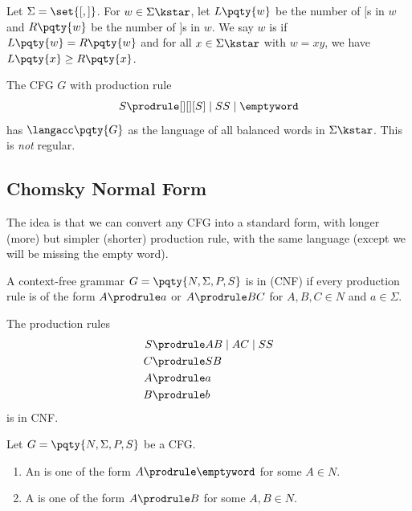 \begin{definition}
    Let \(\Sigma = \set{[, ]}\). For \(w \in \Sigma\kstar\), let \(L\pqty{w}\) be the number of \([\)s in \(w\) and \(R\pqty{w}\) be the number of \(]\)s in \(w\). We say \(w\) is  if \(L\pqty{w} = R\pqty{w}\) and for all \(x \in \Sigma\kstar\) with \(w = xy\), we have \(L\pqty{x} \geq R\pqty{x}\).
\end{definition}

\begin{proposition}
    \label{prop:balanced-parentheses}%
    The CFG \(G\) with production rule
    \[
        S \prodrule[][] [S] \mid SS \mid \emptyword
    \]
    has \(\langacc\pqty{G}\) as the language of all balanced words in \(\Sigma\kstar\). This is \emph{not} regular.
\end{proposition}

\subsection{Chomsky Normal Form}

The idea is that we can convert any CFG into a standard form, with longer (more) but simpler (shorter) production rule, with the same language (except we will be missing the empty word).

\begin{definition}
    A context-free grammar \(G = \pqty{N, \Sigma, P, S}\) is in  (CNF) if every production rule is of the form \(A \prodrule a\) or \(A \prodrule BC\) for \(A, B, C \in N\) and \(a \in \Sigma\).
\end{definition}

\begin{example}
    \label{ex:brackets-in-disguise}%
    The production rules
    \begin{align*}
        S &\prodrule AB \mid AC \mid SS \\
        C &\prodrule SB \\
        A &\prodrule a \\
        B &\prodrule b
    \end{align*}
    is in CNF.
\end{example}

\begin{definition}
    Let \(G = \pqty{N, \Sigma, P, S}\) be a CFG.

    \begin{enumerate}[label=(\roman*)]
        \item An  is one of the form \(A \prodrule \emptyword\) for some \(A \in N\).
        \item A  is one of the form \(A \prodrule B\) for some \(A, B \in N\).
    \end{enumerate}
\end{definition}

